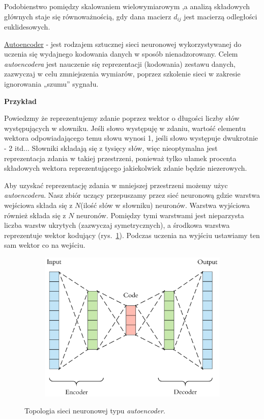 Podobienstwo pomiędzy skalowaniem  wielowymiarowym  ,a  analizą  składowych głównych staje się równoważnością, gdy dana macierz $ d_{ij} $ jest macierzą odległości euklidesowych.

\underline{Autoencoder} - jest rodzajem sztucznej sieci neuronowej wykorzystywanej do uczenia się wydajnego kodowania danych w sposób nienadzorowany. Celem \textit{autoencodera} jest nauczenie się reprezentacji (kodowania) zestawu danych, zazwyczaj w celu zmniejszenia wymiarów, poprzez szkolenie sieci w zakresie ignorowania „szumu” sygnału.

\textbf{Przykład}

Powiedzmy że reprezentujemy zdanie poprzez wektor o długości liczby słów występujących w słowniku. Jeśli słowo występuję w zdaniu, wartość elementu wektora odpowiadającego temu słowu wynosi 1, jeśli słowo występuje dwukrotnie - 2 itd... Słowniki składają się z tysięcy słów, więc nieoptymalna jest reprezentacja zdania w takiej przestrzeni, ponieważ tylko ułamek procenta składowych wektora reprezentującego jakiekolwiek zdanie będzie niezerowych. 

Aby uzyskać reprezentację zdania w mniejszej przestrzeni możemy użyc \textit{autoencodera}. Nasz zbiór uczący przepuszamy przez sieć neuronową gdzie warstwa wejściowa składa się z $ N $(ilość słów w słowniku) neuronów. Warstwa wyjściowa również składa się z $ N $ neuronów. Pomiędzy tymi warstwami jest nieparzysta liczba warstw ukrytych (zazwyczaj symetrycznych), a środkowa warstwa reprezentuje wektor kodujący (rys.~\ref{autoencoder}). Podczas uczenia na wyjściu ustawiamy ten sam wektor co na wejściu.

\begin{figure} [H]
	\centering
	\begin{subfigure}{.99\textwidth}
		\centering
		\includegraphics[width=1.0\linewidth]{EDMIIssues/Figures/autoencoder.png}
	\end{subfigure}
	\caption{Topologia sieci neuronowej typu \textit{autoencoder}.}
	\label{autoencoder}
\end{figure}